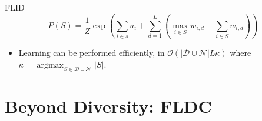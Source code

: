 \documentclass{beamer}
\DeclareMathOperator*{\argmax}{argmax}
\begin{document}
\begin{frame}{FLID}
  \begin{equation*}
    P(S) = \frac{1}{Z}\exp{\left(\sum_{i \in s} u_{i} + \sum_{d=1}^{L}\left(\max_{i \in S}{w_{i,d} - \sum_{i \in S}w_{i,d}}\right)\right)}
  \end{equation*}
  \begin{itemize}
    \item Learning can be performed efficiently, in $\mathcal{O}(|\mathcal{D} \cup \mathcal{N}|L\kappa)$ where $\kappa = \argmax_{S \in \mathcal{D} \cup \mathcal{N}}|S|$.
  \end{itemize}
\end{frame}

\section{Beyond Diversity: FLDC}
\end{document}
